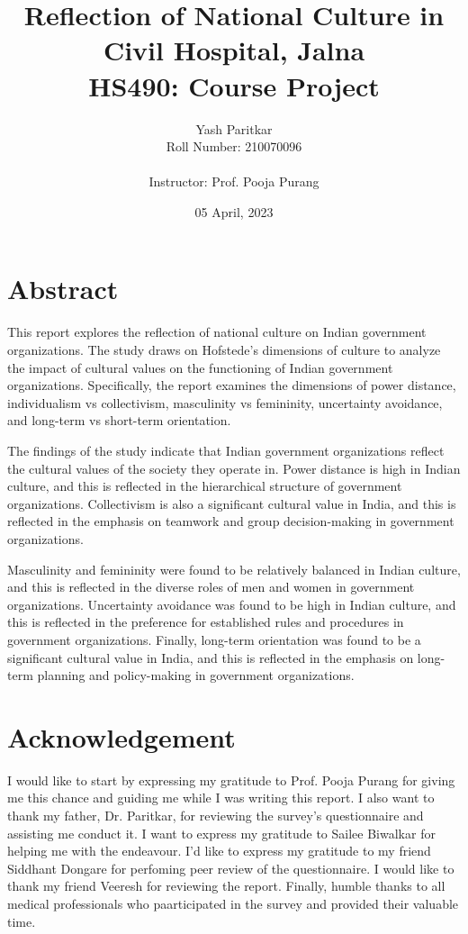 \documentclass{article}
\title{\textbf{Reflection of National Culture in Civil Hospital, Jalna}\\
HS490: Course Project}
\author{Yash Paritkar\\
Roll Number: 210070096\\
\\
Instructor: Prof. Pooja Purang}
\date{05 April, 2023}
\begin{document}
\maketitle

\newpage
\section*{Abstract}
This report explores the reflection of national culture on Indian government organizations. The study draws on Hofstede's dimensions of culture to analyze the impact of cultural values on the functioning of Indian government organizations. Specifically, the report examines the dimensions of power distance, individualism vs collectivism, masculinity vs femininity, uncertainty avoidance, and long-term vs short-term orientation.

The findings of the study indicate that Indian government organizations reflect the cultural values of the society they operate in. Power distance is high in Indian culture, and this is reflected in the hierarchical structure of government organizations. Collectivism is also a significant cultural value in India, and this is reflected in the emphasis on teamwork and group decision-making in government organizations.

Masculinity and femininity were found to be relatively balanced in Indian culture, and this is reflected in the diverse roles of men and women in government organizations. Uncertainty avoidance was found to be high in Indian culture, and this is reflected in the preference for established rules and procedures in government organizations. Finally, long-term orientation was found to be a significant cultural value in India, and this is reflected in the emphasis on long-term planning and policy-making in government organizations.


\newpage
\section*{Acknowledgement}
I would like to start by expressing my gratitude to Prof. Pooja Purang for giving me this chance and guiding me while I was writing this report. I also want to thank my father, Dr. Paritkar, for reviewing the survey's questionnaire and assisting me conduct it. I want to express my gratitude to Sailee Biwalkar for helping me with the endeavour. I'd like to express my gratitude to my friend Siddhant Dongare for perfoming peer review of the questionnaire. I would like to thank my friend Veeresh for reviewing the report. Finally, humble thanks to all medical professionals who paarticipated in the survey and provided their valuable time.
\end{document}
